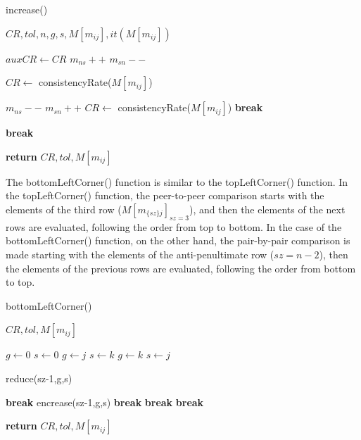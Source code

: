 \documentclass[10pt,fleqn,a4paper,twoside]{article}
\begin{document}
\begin{algorithm}
\caption{increase()}\label{alg:increase}
	\begin{algorithmic}
	\Require $CR, tol, n, g, s, M[m_{ij}], it(M[m_{ij}])$
	
		\State $auxCR \gets CR$
		\State $m_{ns} ++$
		\State $m_{sn} --$
		
		\State $CR \gets$ consistencyRate($M[m_{ij}]$)
		
			\State $m_{ns} --$
			\State $m_{sn} ++$
			\State $CR \gets$ consistencyRate($M[m_{ij}]$)
			\State \textbf{break}
			
			\State \textbf{break}
		\EndIf
\EndWhile

\State \textbf{return} $CR, tol, M[m_{ij}]$	
	
\end{algorithmic}
\end{algorithm}

The bottomLeftCorner() function is similar to the topLeftCorner() function. In the topLeftCorner() function, the peer-to-peer comparison starts with the elements of the third row ($M[m_{\{sz\}j}]_{sz=3}$), and then the elements of the next rows are evaluated, following the order from top to bottom. In the case of the bottomLeftCorner() function, on the other hand, the pair-by-pair comparison is made starting with the elements of the anti-penultimate row ($sz = n-2$), then the elements of the previous rows are evaluated, following the order from bottom to top.

\begin{algorithm}
\caption{bottomLeftCorner()}\label{alg:bottomLeftCorner}
	\begin{algorithmic}
	\Require $CR, tol, M[m_{ij}]$
	
					\State $g \gets 0$
					\State $s \gets 0$
						\State $g \gets j$
						\State $s \gets k$
						\State $g \gets k$
						\State $s \gets j$
					\EndIf
					
						
						\State reduce(sz-1,g,s)
						
							\State \textbf{break}
							encrease(sz-1,g,s)
								\State \textbf{break}
							\EndIf
						\EndIf
					\EndIf
				\EndFor
					\State \textbf{break}
				\EndIf
			\EndFor
					\State \textbf{break}
				\EndIf	
		\EndFor
	\EndIf
	
	\State \textbf{return} $CR, tol, M[m_{ij}]$

\end{algorithmic}
\end{algorithm}
    
\end{document}

